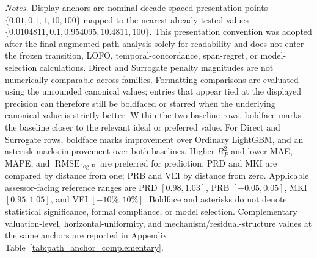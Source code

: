 \documentclass[10pt]{article}
\theoremstyle{definition}
\newcommand{\1}{\mathbf{1}}
\newcommand{\latesttext}[1]{\textcolor{latestPurple}{#1}}
\begin{document}
{\begin{table}[!htbp]
{\begin{tabular}{llrrrrrrrr}
\bottomrule
\end{tabular}}
\vspace{1mm}
\begin{minipage}{\textwidth}
\scriptsize
\emph{Notes.}
\latesttext{Display anchors are nominal decade-spaced presentation points $\{0.01,0.1,1,10,100\}$ mapped to the nearest already-tested values $\{0.0104811,0.1,0.954095,10.4811,100\}$. This presentation convention was adopted after the final augmented path analysis solely for readability and does not enter the frozen transition, LOFO, temporal-concordance, span-regret, or model-selection calculations. Direct and Surrogate penalty magnitudes are not numerically comparable across families.}
\latesttext{Formatting comparisons are evaluated using the unrounded canonical values; entries that appear tied at the displayed precision can therefore still be boldfaced or starred when the underlying canonical value is strictly better.} Within the two baseline rows, boldface marks the baseline closer to the relevant ideal or preferred value. For Direct and Surrogate rows, boldface marks improvement over Ordinary LightGBM, and an asterisk marks improvement over both baselines. Higher $R^2_P$ and lower MAE, MAPE, and $\operatorname{RMSE}_{\log P}$ are preferred for prediction. PRD and MKI are compared by distance from one; PRB and VEI by distance from zero. Applicable assessor-facing reference ranges are PRD $[0.98,1.03]$, PRB $[-0.05,0.05]$, MKI $[0.95,1.05]$, and VEI $[-10\%,10\%]$. Boldface and asterisks do not denote statistical significance, formal compliance, or model selection. Complementary valuation-level, horizontal-uniformity, and mechanism/residual-structure values at the same anchors are reported in Appendix Table~\ref{tab:path_anchor_complementary}.
\end{minipage}
\end{table}
}
\end{document}
